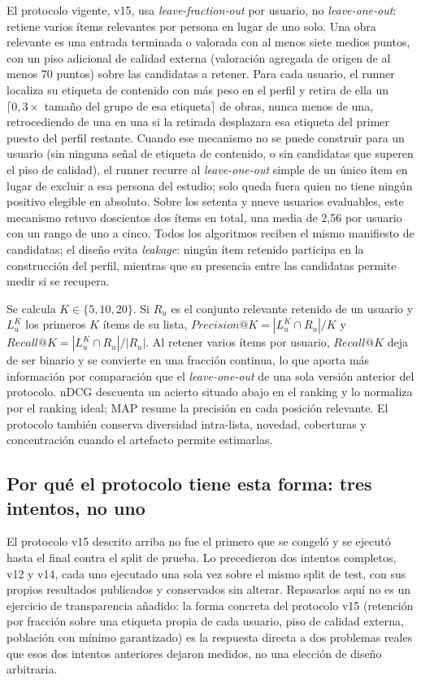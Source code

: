 El protocolo vigente, v15, usa \emph{leave-fraction-out} por usuario, no
\emph{leave-one-out}: retiene varios ítems relevantes por persona en lugar de uno solo. Una
obra relevante es una entrada terminada o valorada con al menos siete medios puntos, con un
piso adicional de calidad externa (valoración agregada de origen de al menos 70 puntos) sobre
las candidatas a retener. Para cada usuario, el runner localiza su etiqueta de contenido con
más peso en el perfil y retira de ella un \(\lceil 0{,}3\times\) tamaño del grupo de esa
etiqueta\(\rceil\) de obras, nunca menos de una, retrocediendo de una en una si la retirada
desplazara esa etiqueta del primer puesto del perfil restante. Cuando ese mecanismo no se
puede construir para un usuario (sin ninguna señal de etiqueta de contenido, o sin candidatas
que superen el piso de calidad), el runner recurre al \emph{leave-one-out} simple de un único
ítem en lugar de excluir a esa persona del estudio; solo queda fuera quien no tiene ningún
positivo elegible en absoluto. Sobre los setenta y nueve usuarios evaluables, este mecanismo
retuvo doscientos dos ítems en total, una media de 2{,}56 por usuario con un rango de uno a
cinco. Todos los algoritmos reciben el mismo manifiesto de candidatas; el diseño evita
\emph{leakage}: ningún ítem retenido participa en la construcción del perfil, mientras que su
presencia entre las candidatas permite medir si se recupera.

Se calcula \(K\in\{5,10,20\}\). Si \(R_u\) es el conjunto relevante retenido de un usuario y
\(L_u^K\) los primeros \(K\) ítems de su lista, \(Precision@K=|L_u^K\cap R_u|/K\) y
\(Recall@K=|L_u^K\cap R_u|/|R_u|\). Al retener varios ítems por usuario, \(Recall@K\) deja de
ser binario y se convierte en una fracción continua, lo que aporta más información por
comparación que el \emph{leave-one-out} de una sola versión anterior del protocolo. nDCG
descuenta un acierto situado abajo en el ranking y lo normaliza por el ranking ideal; MAP
resume la precisión en cada posición relevante. El protocolo también conserva diversidad
intra-lista, novedad, coberturas y concentración cuando el artefacto permite estimarlas.

\subsection{Por qué el protocolo tiene esta forma: tres intentos, no uno}\label{sec:exp-evolucion}

El protocolo v15 descrito arriba no fue el primero que se congeló y se ejecutó hasta el final
contra el split de prueba. Lo precedieron dos intentos completos, v12 y v14, cada uno
ejecutado una sola vez sobre el mismo split de test, con sus propios resultados publicados y
conservados sin alterar. Repasarlos aquí no es un ejercicio de transparencia añadido: la forma
concreta del protocolo v15 (retención por fracción sobre una etiqueta propia de cada usuario,
piso de calidad externa, población con mínimo garantizado) es la respuesta directa a dos
problemas reales que esos dos intentos anteriores dejaron medidos, no una elección de diseño
arbitraria.


